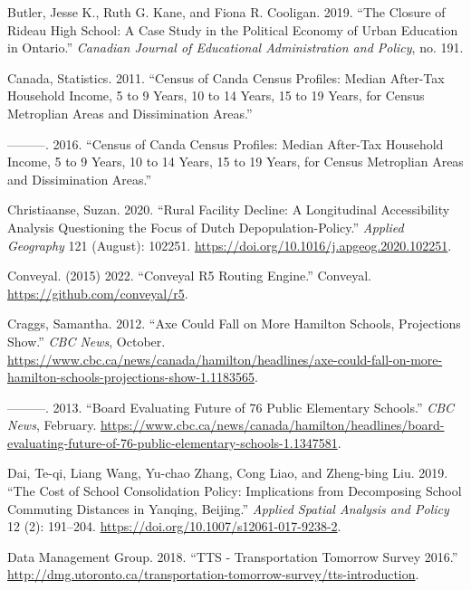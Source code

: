 \documentclass[
default
]{sn-jnl}
\newlength{\cslhangindent}
\newenvironment{CSLReferences}[2] %
 {\begin{list}{}{%
  \setlength{\itemindent}{0pt}
  \setlength{\leftmargin}{0pt}
  \setlength{\parsep}{0pt}
  \ifodd #1
   \setlength{\leftmargin}{\cslhangindent}
   \setlength{\itemindent}{-1\cslhangindent}
  \fi
  \setlength{\itemsep}{#2\baselineskip}}}
 {\end{list}}
\begin{document}
\begin{CSLReferences}{1}{0}
Butler, Jesse K., Ruth G. Kane, and Fiona R. Cooligan. 2019. {``The
{Closure} of {Rideau High School}: {A Case Study} in the {Political
Economy} of {Urban Education} in {Ontario}.''} \emph{Canadian Journal of
Educational Administration and Policy}, no. 191.

Canada, Statistics. 2011. {``Census of Canda Census Profiles: Median
After-Tax Household Income, 5 to 9 Years, 10 to 14 Years, 15 to 19
Years, for Census Metroplian Areas and Dissimination Areas.''}

---------. 2016. {``Census of Canda Census Profiles: Median After-Tax
Household Income, 5 to 9 Years, 10 to 14 Years, 15 to 19 Years, for
Census Metroplian Areas and Dissimination Areas.''}

Christiaanse, Suzan. 2020. {``Rural Facility Decline: A Longitudinal
Accessibility Analysis Questioning the Focus of Dutch
Depopulation-Policy.''} \emph{Applied Geography} 121 (August): 102251.
\url{https://doi.org/10.1016/j.apgeog.2020.102251}.

Conveyal. (2015) 2022. {``Conveyal {R5 Routing Engine}.''} {Conveyal}.
\url{https://github.com/conveyal/r5}.

Craggs, Samantha. 2012. {``Axe Could Fall on More Hamilton Schools,
Projections Show.''} \emph{{CBC} News}, October.
\url{https://www.cbc.ca/news/canada/hamilton/headlines/axe-could-fall-on-more-hamilton-schools-projections-show-1.1183565}.

---------. 2013. {``Board Evaluating Future of 76 Public Elementary
Schools.''} \emph{{CBC} News}, February.
\url{https://www.cbc.ca/news/canada/hamilton/headlines/board-evaluating-future-of-76-public-elementary-schools-1.1347581}.

Dai, Te-qi, Liang Wang, Yu-chao Zhang, Cong Liao, and Zheng-bing Liu.
2019. {``The Cost of School Consolidation Policy: Implications from
Decomposing School Commuting Distances in Yanqing, Beijing.''}
\emph{Applied Spatial Analysis and Policy} 12 (2): 191--204.
\url{https://doi.org/10.1007/s12061-017-9238-2}.

Data Management Group. 2018. {``{TTS} - {Transportation} {Tomorrow}
{Survey} 2016.''}
\url{http://dmg.utoronto.ca/transportation-tomorrow-survey/tts-introduction}.


\end{CSLReferences}
\end{document}
